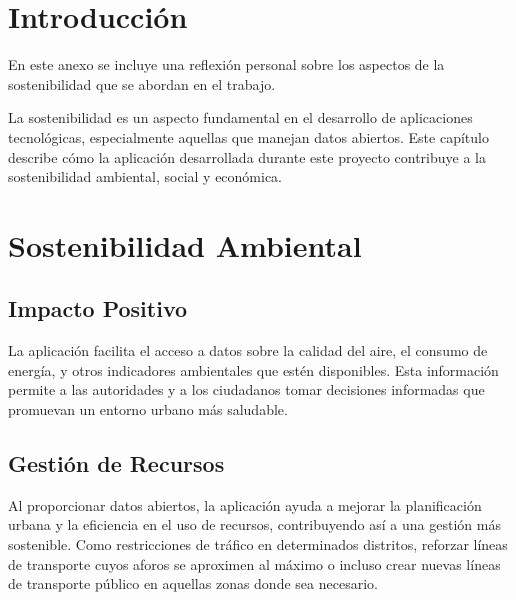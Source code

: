 
\begin{comment}
Este anexo incluirá una reflexión personal del alumnado sobre los aspectos de la sostenibilidad que se abordan en el trabajo.
Se pueden incluir tantas subsecciones como sean necesarias con la intención de explicar las competencias de sostenibilidad adquiridas durante el alumnado y aplicadas al Trabajo de Fin de Grado.

Más información en el documento de la CRUE \url{https://www.crue.org/wp-content/uploads/2020/02/Directrices_Sosteniblidad_Crue2012.pdf}.

Este anexo tendrá una extensión comprendida entre 600 y 800 palabras.
\end{comment}

\section{Introducción}
En este anexo se incluye una reflexión personal sobre los aspectos de la sostenibilidad que se abordan en el trabajo.

La sostenibilidad es un aspecto fundamental en el desarrollo de aplicaciones tecnológicas, especialmente aquellas que manejan datos abiertos. Este capítulo describe cómo la aplicación desarrollada durante este proyecto contribuye a la sostenibilidad ambiental, social y económica.

\section{Sostenibilidad Ambiental}
\subsection{Impacto Positivo}
La aplicación facilita el acceso a datos sobre la calidad del aire, el consumo de energía, y otros indicadores ambientales que estén disponibles. Esta información permite a las autoridades y a los ciudadanos tomar decisiones informadas que promuevan un entorno urbano más saludable.

\subsection{Gestión de Recursos}
Al proporcionar datos abiertos, la aplicación ayuda a mejorar la planificación urbana y la eficiencia en el uso de recursos, contribuyendo así a una gestión más sostenible. Como restricciones de tráfico en determinados distritos, reforzar líneas de transporte cuyos aforos se aproximen al máximo o incluso crear nuevas líneas de transporte público en aquellas zonas donde sea necesario.

